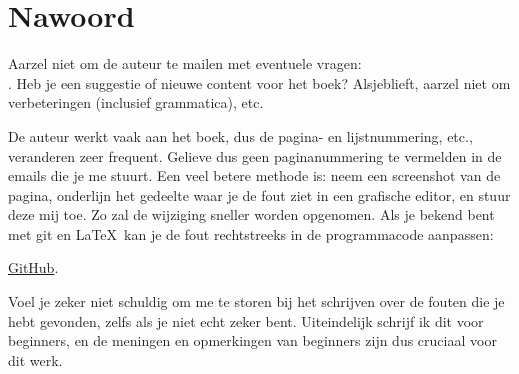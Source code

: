 \part*{Nawoord}

\mysection{\NLph{}}

Aarzel niet om de auteur te mailen met eventuele vragen: \\
\GTT{<\EMAIL>}.
Heb je een suggestie of nieuwe content voor het boek?
Alsjeblieft, aarzel niet om verbeteringen (inclusief grammatica), etc.

De auteur werkt vaak aan het boek, dus de pagina- en lijstnummering, etc., veranderen zeer frequent.
Gelieve dus geen paginanummering te vermelden in de emails die je me stuurt.
Een veel betere methode is: neem een screenshot van de pagina, onderlijn het gedeelte waar je de fout ziet in een grafische editor,
en stuur deze mij toe. Zo zal de wijziging sneller worden opgenomen.
Als je bekend bent met git en \LaTeX\, kan je de fout rechtstreeks in de programmacode aanpassen:

\href{http://go.yurichev.com/17089}{GitHub}.

Voel je zeker niet schuldig om me te storen bij het schrijven over de fouten die je hebt gevonden, zelfs als je niet echt zeker bent.
Uiteindelijk schrijf ik dit voor beginners, en de meningen en opmerkingen van beginners zijn dus cruciaal voor dit werk.

